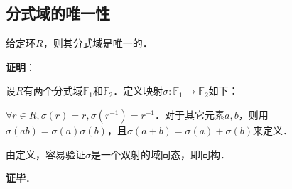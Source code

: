 \subsection{分式域的唯一性}

\begin{theorem}{}\label{FrcFld_the1}
给定环$R$，则其分式域是唯一的．
\end{theorem}

\textbf{证明}：

设$R$有两个分式域$\mathbb{F}_1$和$\mathbb{F}_2$．定义映射$\sigma:\mathbb{F}_1\to\mathbb{F}_2$如下：

$\forall r\in R, \sigma(r)=r, \sigma(r^{-1})=r^{-1}$．对于其它元素$a, b$，则用$\sigma(ab)=\sigma(a)\sigma(b)$，且$\sigma(a+b)=\sigma(a)+\sigma(b)$来定义．

由定义，容易验证$\sigma$是一个双射的域同态，即同构．

\textbf{证毕}．













